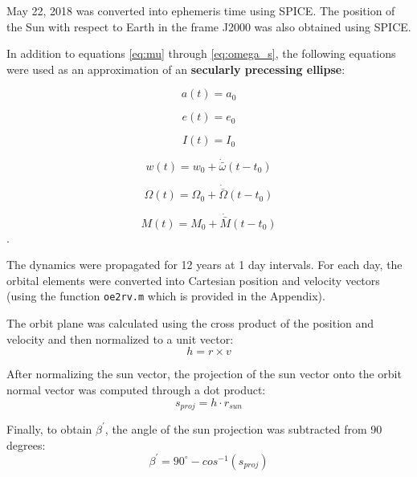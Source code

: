 \documentclass[conf]{new-aiaa}
\begin{document}
May 22, 2018 was converted into ephemeris time using SPICE. The position of the Sun with respect to Earth in the frame J2000 was also obtained using SPICE. \newline 

In addition to equations \ref{eq:mu} through \ref{eq:omega_s}, the following equations were used as an approximation of an \textbf{secularly precessing ellipse}: 

\begin{equation}
	a(t) = a_0	
\end{equation}

\begin{equation}
	e(t) = e_0
\end{equation}

\begin{equation}
	I(t) = I_0 
\end{equation}

\begin{equation}
	w(t) = w_0 + \dot{\bar{\omega}} (t - t_0)
\end{equation}

\begin{equation}
	\Omega(t) = \Omega_0 + \dot{\bar{\Omega}} (t - t_0)
\end{equation}

\begin{equation}
	M(t) = M_0 + \dot{\bar{M}} (t - t_0)
\end{equation}. 

The dynamics were propagated for 12 years at 1 day intervals. For each day, the orbital elements were converted into Cartesian position and velocity vectors (using the function \texttt{oe2rv.m} which is provided in the Appendix). \newline 

The orbit plane was calculated using the cross product of the position and velocity and then normalized to a unit vector: 
\begin{equation}
	h = r \times v 
\end{equation}

After normalizing the sun vector, the projection of the sun vector onto the orbit normal vector was computed through a dot product: 
\begin{equation}
	s_{proj} = h \cdot r_{sun}
\end{equation}

Finally, to obtain $\beta ^\prime$, the angle of the sun projection was subtracted from 90 degrees: 
\begin{equation}
	\beta ^\prime = 90 ^\circ - cos^{-1} ( s_{proj} )
\end{equation}
\end{document}
